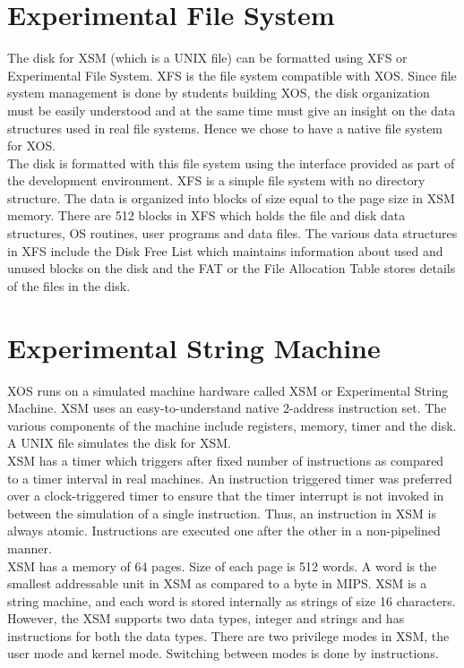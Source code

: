 \documentclass{sig-alternate}
\begin{document}
\section{Experimental File System }
The disk for XSM (which is a UNIX file) can be formatted using XFS or Experimental File System. XFS is the file system compatible with XOS. Since file system management is done by students building XOS, the disk organization must be easily understood and at the same time must give an insight on the data structures used in real file systems. Hence we chose to have a native file system for XOS.\\

The disk is formatted with this file system using the interface provided as part of the development environment. XFS is a simple file system with no directory structure. The data is organized into blocks of size equal to the page size in XSM memory. There are 512 blocks in XFS which holds the file and disk data structures, OS routines, user programs and data files. The various data structures in XFS include the Disk Free List which maintains information about used and unused blocks on the disk and the FAT or the File Allocation Table stores details of the files in the disk.


\section{Experimental String Machine }
XOS runs on a simulated machine hardware called XSM or Experimental String Machine. XSM uses an easy-to-understand native 2-address instruction set. The various components of the machine include registers, memory, timer and the disk. A UNIX file simulates the disk for XSM.\\

XSM has a timer which triggers after fixed number of instructions as compared to a timer interval in real machines. An instruction triggered timer was preferred over a clock-triggered timer to ensure that the timer interrupt is not invoked in between the simulation of a single instruction. Thus, an instruction in XSM is always atomic. Instructions are executed one after the other in a non-pipelined manner.\\

XSM has a memory of 64 pages. Size of each page is 512 words. A word is the smallest addressable unit in XSM as compared to a byte in MIPS. XSM is a string machine, and each word is stored internally as strings of size 16 characters.  However, the XSM supports two data types, integer and strings and has instructions for both  the data types. There are two privilege modes in XSM, the user mode and kernel mode. Switching between modes is done by instructions.\\
\end{document}
